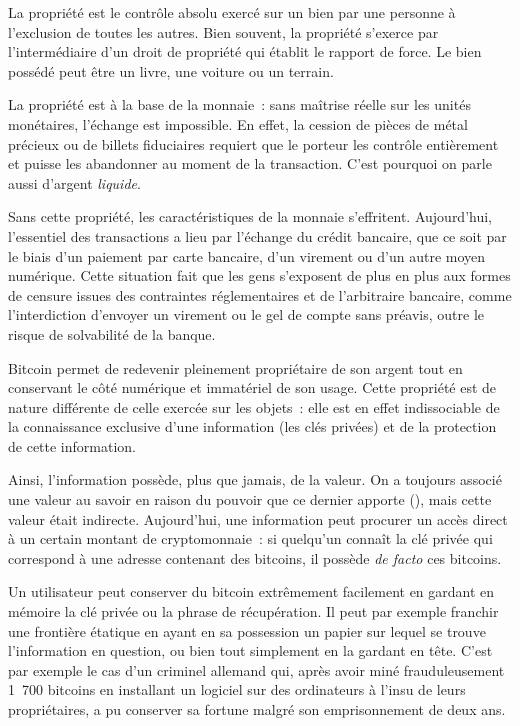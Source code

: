 La propriété est le contrôle absolu exercé sur un bien par une personne à l'exclusion de toutes les autres. Bien souvent, la propriété s'exerce par l'intermédiaire d'un droit de propriété qui établit  le rapport de force. Le bien possédé peut être un livre, une voiture ou un terrain. %

La propriété est à la base de la monnaie~: sans maîtrise réelle sur les unités monétaires, l'échange est impossible. En effet, la cession de pièces de métal précieux ou de billets fiduciaires requiert que le porteur les contrôle entièrement et puisse les abandonner au moment de la transaction. C'est pourquoi on parle aussi d'argent \emph{liquide}.

Sans cette propriété, les caractéristiques de la monnaie s'effritent. Aujourd'hui, l'essentiel des transactions a lieu par l'échange du crédit bancaire, que ce soit par le biais d'un paiement par carte bancaire, d'un virement ou d'un autre moyen numérique. Cette situation fait que les gens s'exposent de plus en plus aux formes de censure issues des contraintes réglementaires et de l'arbitraire bancaire, comme l'interdiction d'envoyer un virement ou le gel de compte sans préavis, outre le risque de solvabilité de la banque.

Bitcoin permet de redevenir pleinement propriétaire de son argent tout en conservant le côté numérique et immatériel de son usage. Cette propriété est de nature différente de celle exercée sur les objets~: elle est en effet indissociable de la connaissance exclusive d'une information (les clés privées) et de la protection de cette information.

Ainsi, l'information possède, plus que jamais, de la valeur. On a toujours associé une valeur au savoir en raison du pouvoir que ce dernier apporte (), mais cette valeur était indirecte. Aujourd'hui, une information peut procurer un accès direct à un certain montant de cryptomonnaie~: si quelqu'un connaît la clé privée qui correspond à une adresse contenant des bitcoins, il possède \emph{de facto} ces bitcoins.

Un utilisateur peut conserver du bitcoin extrêmement facilement en gardant en mémoire la clé privée ou la phrase de récupération. Il peut par exemple franchir une frontière étatique en ayant en sa possession un papier sur lequel se trouve l'information en question, ou bien tout simplement en la gardant en tête. C'est par exemple le cas d'un criminel allemand qui, après avoir miné frauduleusement 1~700 bitcoins en installant un logiciel sur des ordinateurs à l'insu de leurs propriétaires, a pu conserver sa fortune malgré son emprisonnement de deux ans.

